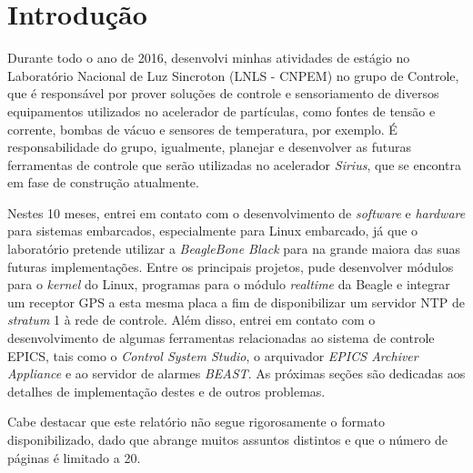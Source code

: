 \section {Introdução}

Durante todo o ano de 2016, desenvolvi minhas atividades de
estágio no Laboratório Nacional de Luz Sincroton (LNLS - CNPEM) no grupo de Controle, que
é responsável por prover soluções de controle e sensoriamento de diversos
equipamentos utilizados no acelerador de partículas, como fontes de tensão e
corrente, bombas de vácuo e sensores de temperatura, por exemplo. É
responsabilidade do grupo, igualmente, planejar e desenvolver as futuras
ferramentas de controle que serão utilizadas no acelerador \textit{Sirius}, que
se encontra em fase de construção atualmente.

\vspace{12pt}

Nestes 10 meses, entrei em contato com o desenvolvimento
de \textit{software} e \textit{hardware} para sistemas embarcados, especialmente
para Linux embarcado, já que o laboratório pretende utilizar a
\textit{BeagleBone Black} para na grande maiora das suas futuras implementações.
Entre os principais projetos, pude desenvolver módulos para o \textit{kernel} do Linux, programas
para o módulo \textit{realtime} da Beagle e integrar um receptor GPS a esta
mesma placa a fim de disponibilizar um servidor NTP de \textit{stratum} 1 à
rede de controle. Além disso, entrei em contato com o desenvolvimento de
algumas ferramentas relacionadas ao sistema de controle EPICS, tais como o
\textit{Control System Studio}, o arquivador \textit{EPICS Archiver Appliance}
e ao servidor de alarmes \textit{BEAST}. As próximas seções são dedicadas aos
detalhes de implementação destes e de outros problemas.

\vspace{12pt}

Cabe destacar que este relatório não segue rigorosamente o formato
disponibilizado, dado que abrange muitos assuntos distintos e que o número de
páginas é limitado a 20.

\newpage
